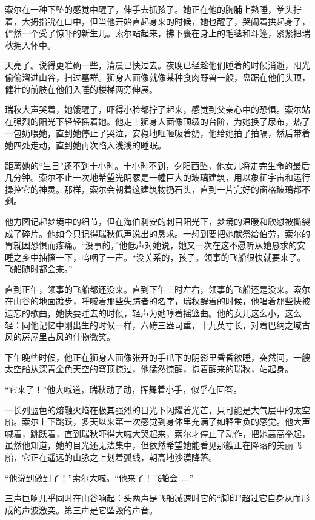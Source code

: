\documentclass[AutoFakeBold=true]{book}
\begin{document}
索尔在一种下坠的感觉中醒了，伸手去抓孩子。她正在他的胸脯上熟睡，拳头拧着，大拇指吮在口中，但当他开始直起身来的时候，她也醒了，哭闹着拱起身子，俨然一个受了惊吓的新生儿。索尔站起来，拂下裹在身上的毛毯和斗篷，紧紧把瑞秋拥入怀中。

天亮了。说得更准确一些，清晨已快过去。夜晚已经趁他们睡着的时候消逝，阳光偷偷溜进山谷，扫过墓群。狮身人面像就像某种食肉野兽一般，盘踞在他们头顶，健壮的前肢在他们入睡的楼梯两旁伸展。

瑞秋大声哭着，她饿醒了，吓得小脸都拧了起来，感觉到父亲心中的恐惧。索尔站在强烈的阳光下轻轻摇着她。他走上狮身人面像顶级的台阶，为她换了尿布，热了一包奶喂她，直到她停止了哭泣，安稳地咂咂吸着奶，他给她拍了拍嗝，然后带着她四处走动，直到她再次陷入浅浅的睡眠。

距离她的``生日''还不到十小时。十小时不到，夕阳西坠，他女儿将走完生命的最后几分钟。索尔不止一次地希望光阴冢是一幢巨大的玻璃建筑，用以象征宇宙和运行操控它的神灵。那样，索尔会朝着这建筑物扔石头，直到一片完好的窗格玻璃都不剩。

他力图记起梦境中的细节，但在海伯利安的刺目阳光下，梦境的温暖和欣慰被撕裂成了碎片。他如今只记得瑞秋低声说出的恳求。一想到要把她献祭给伯劳，索尔的胃就因恐惧而疼痛。``没事的，''他低声对她说，她又一次在这不愿听从她恳求的安睡之乡中抽搐一下，呜咽了一声。``没关系的，孩子。领事的飞船很快就要来了。飞船随时都会来。''

\vspace*{1em}

直到正午，领事的飞船都还没来。直到下午三时左右，领事的飞船还是没来。索尔在山谷的地面踱步，呼喊着那些失踪者的名字，瑞秋醒着的时候，他唱着那些快被遗忘的歌曲，她快要睡去的时候，轻声为她哼着摇篮曲。他的女儿这么小，这么轻：同他记忆中刚出生的时候一样，六磅三盎司重，十九英寸长，对着巴纳之域古风的房屋里古风的什物微笑。

下午晚些时候，他正在狮身人面像张开的手爪下的阴影里昏昏欲睡，突然间，一艘太空船从深青金色天空的穹顶掠过，他猛然惊醒，抱着醒来的瑞秋，站起身。

``它来了！''他大喊道，瑞秋动了动，挥舞着小手，似乎在回答。

一长列蓝色的熔融火焰在极其强烈的日光下闪耀着光芒，只可能是大气层中的太空船。索尔上下跳跃，多天以来第一次感觉到身体里充满了如释重负的感觉。他大声喊着，跳跃着，直到瑞秋吓得大喊大哭起来，索尔才停止了动作，把她高高举起，虽然他知道，她的目光还无法集中，但依然希望她能看见那艘正在降落的美丽飞船，它正在遥远的山脉之上划着弧线，朝高地沙漠降落。

``他说到做到了！''索尔大喊。``他来了！飞船会……''

三声巨响几乎同时在山谷响起：头两声是飞船减速时它的``脚印''超过它自身从而形成的声波激突。第三声是它坠毁的声音。
\end{document}
